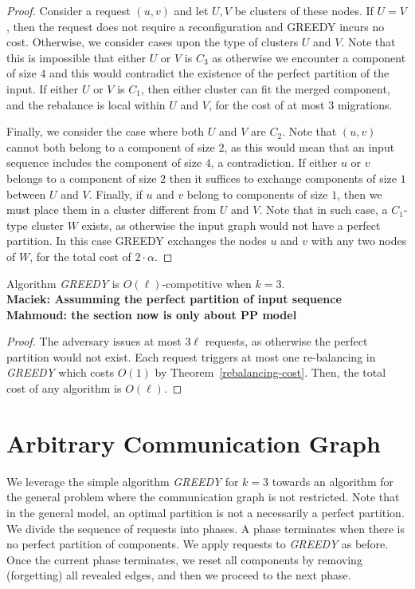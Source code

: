 \documentclass[manuscript,screen=true]{acmart}
\newcommand\mahmoud[1]{\color{green}\textbf{\\ Mahmoud: #1}\\\color{black}}
\newcommand\maciek[1]{\color{brown}\textbf{\\ Maciek: #1}\color{black}}
\begin{document}
\begin{appendix}
\begin{proof}
    Consider a request $(u, v)$ and let $U, V$ be clusters of these nodes.
    If $U=V$, then the request does not require a reconfiguration and GREEDY incurs no cost.
    Otherwise, we consider cases upon the type of clusters $U$ and $V$.
    Note that this is impossible that either $U$ or $V$ is $C_3$ as otherwise we encounter a component of size $4$ and this would contradict the existence of the perfect partition of the input.
    If either $U$ or $V$ is $C_1$, then either cluster can fit the merged component, and the rebalance is local within $U$ and $V$, for the cost of at most $3$ migrations.
  
    Finally, we consider the case where both $U$ and $V$ are $C_2$. Note that $(u,v)$ cannot both belong to a component of size $2$, as this would mean that an input sequence includes the component of size $4$, a contradiction. 
    If either $u$ or $v$ belongs to a component of size $2$ then it suffices to exchange components of size $1$ between $U$ and $V$.
    Finally, if $u$ and $v$ belong to components of size $1$, then we must place them in a cluster different from $U$ and $V$.
    Note that in such case, a $C_1$-type cluster $W$ exists, as otherwise the input graph would not have a perfect partition. In this case GREEDY exchanges the nodes $u$ and $v$ with any two nodes of $W$, for the total cost of $2\cdot \alpha$.
  \end{proof}
  
    
  \begin{theorem}
    Algorithm \emph{GREEDY} is $O(\ell)$-competitive when $k=3$.
    \maciek{Assumming the perfect partition of input sequence
    \mahmoud{the section now is only about PP model}}
  \end{theorem}
  
  \begin{proof}
    The adversary issues at most $3\ell$ requests, as otherwise the perfect partition would not exist.
    Each request triggers at most one re-balancing in \emph{GREEDY}
    which costs $O(1)$ by Theorem~\ref{rebalancing-cost}.
    Then,
    the total cost of any algorithm is $O(\ell)$.
  \end{proof}
  
  \section{Arbitrary Communication Graph} \label{sec:generalModel}
  
  We leverage the simple algorithm \emph{GREEDY} for $k=3$
  towards an algorithm for the general problem
  where the communication graph is not restricted.
  Note that in the general model,
  an optimal partition is not a necessarily a perfect partition.
  We divide the sequence of requests into phases.
  A phase terminates when there is no perfect partition of components.
  We apply requests to \emph{GREEDY} as before. 
  Once the current phase terminates,
  we reset all components by removing (forgetting) all revealed edges,
  and then we proceed to the next phase.
  

\end{appendix}
\end{document}
